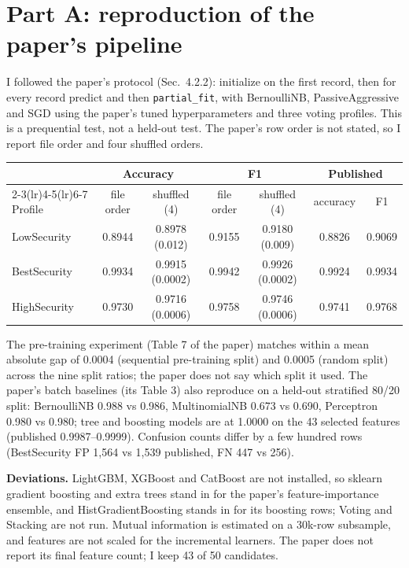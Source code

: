 \documentclass[10pt]{article}
\newcommand{\tsz}{\footnotesize}
\begin{document}
\section{Part A: reproduction of the paper's pipeline}
I followed the paper's protocol (Sec.\ 4.2.2): initialize on the first record, then for every record predict and then \texttt{partial\_fit}, with BernoulliNB, PassiveAggressive and SGD using the paper's tuned hyperparameters and three voting profiles. This is a prequential test, not a held-out test. The paper's row order is not stated, so I report file order and four shuffled orders.
\begin{center}
\tsz
\begin{tabular}{@{}lcccccc@{}}
\toprule
 & \multicolumn{2}{c}{Accuracy} & \multicolumn{2}{c}{F1} & \multicolumn{2}{c}{Published} \\
\cmidrule(lr){2-3}\cmidrule(lr){4-5}\cmidrule(lr){6-7}
Profile & file order & shuffled (4) & file order & shuffled (4) & accuracy & F1 \\
\midrule
LowSecurity  & 0.8944 & 0.8978 (0.012) & 0.9155 & 0.9180 (0.009) & 0.8826 & 0.9069 \\
BestSecurity & 0.9934 & 0.9915 (0.0002) & 0.9942 & 0.9926 (0.0002) & 0.9924 & 0.9934 \\
HighSecurity & 0.9730 & 0.9716 (0.0006) & 0.9758 & 0.9746 (0.0006) & 0.9741 & 0.9768 \\
\bottomrule
\end{tabular}
\end{center}
The pre-training experiment (Table 7 of the paper) matches within a mean absolute gap of 0.0004 (sequential pre-training split) and 0.0005 (random split) across the nine split ratios; the paper does not say which split it used. The paper's batch baselines (its Table 3) also reproduce on a held-out stratified 80/20 split: BernoulliNB 0.988 vs 0.986, MultinomialNB 0.673 vs 0.690, Perceptron 0.980 vs 0.980; tree and boosting models are at 1.0000 on the 43 selected features (published 0.9987--0.9999). Confusion counts differ by a few hundred rows (BestSecurity FP 1,564 vs 1,539 published, FN 447 vs 256).

\textbf{Deviations.} LightGBM, XGBoost and CatBoost are not installed, so sklearn gradient boosting and extra trees stand in for the paper's feature-importance ensemble, and HistGradientBoosting stands in for its boosting rows; Voting and Stacking are not run. Mutual information is estimated on a 30k-row subsample, and features are not scaled for the incremental learners. The paper does not report its final feature count; I keep 43 of 50 candidates.
\end{document}
